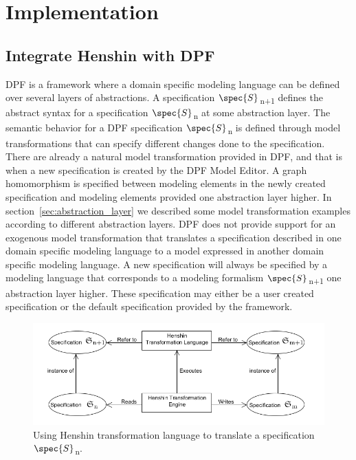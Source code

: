 
\chapter{Implementation} %

\label{Chapter5} %


\section{Integrate Henshin with DPF}
\label{integrate_henshin}

DPF is a framework where a domain specific modeling language can be defined over
several layers of abstractions. A specification 
$\spec{S}$\textsubscript{n+1} defines the abstract syntax for a specification
$\spec{S}$\textsubscript{n} at some abstraction layer.
The semantic behavior for a DPF specification $\spec{S}$\textsubscript{n} is
defined through model transformations that can specify different changes done to
the specification. There are already a natural
model transformation provided in DPF, and that is when a new specification is
created by the DPF Model Editor. A graph homomorphism is specified between
modeling elements in the newly created specification and modeling elements
provided one abstraction layer higher. In section~\ref{sec:abstraction_layer}
we described some model transformation examples according to different
abstraction layers. DPF does not provide support for an exogenous model
transformation that translates a specification described in one domain specific modeling language
to a model expressed in another domain specific modeling language. A new
specification will always be specified by a modeling language that corresponds
to a modeling formalism $\spec{S}$\textsubscript{n+1} one abstraction layer
higher. These specification may either be a user created specification or the
default specification provided by the framework.

\begin{figure}[H]
	\centering
	\includegraphics[scale=0.7]{./Figures/TransformationSolutionBasic.png}
	\caption[Integrating Henshin with DPF]
	{Using Henshin transformation language to translate a specification
	$\spec{S}$\textsubscript{n}.}
	\label{fig:Simple_Solution}
\end{figure}


